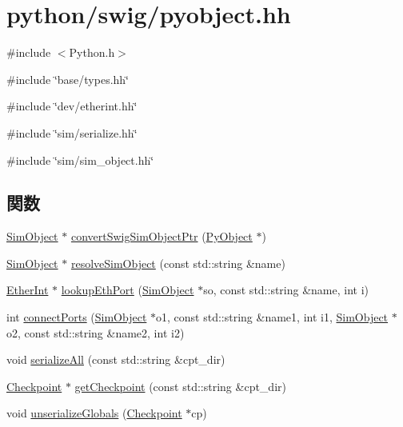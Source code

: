 \hypertarget{pyobject_8hh}{
\section{python/swig/pyobject.hh}
\label{pyobject_8hh}
}
{\ttfamily \#include $<$Python.h$>$}\par
{\ttfamily \#include \char`\"{}base/types.hh\char`\"{}}\par
{\ttfamily \#include \char`\"{}dev/etherint.hh\char`\"{}}\par
{\ttfamily \#include \char`\"{}sim/serialize.hh\char`\"{}}\par
{\ttfamily \#include \char`\"{}sim/sim\_\-object.hh\char`\"{}}\par
\subsection*{関数}
\begin{DoxyCompactItemize}
\item 
\hyperlink{classSimObject}{SimObject} $\ast$ \hyperlink{pyobject_8hh_a35bd8f1c38b15825afd59cae5bb0169e}{convertSwigSimObjectPtr} (\hyperlink{init_8hh_ae19630c1f4ca6d5236b30719d9140013}{PyObject} $\ast$)
\item 
\hyperlink{classSimObject}{SimObject} $\ast$ \hyperlink{pyobject_8hh_a86dd63b6a0431f583c8a984934c005ea}{resolveSimObject} (const std::string \&name)
\item 
\hyperlink{classEtherInt}{EtherInt} $\ast$ \hyperlink{pyobject_8hh_a7140d9d13a7d38ed7ac6fe75319f64ca}{lookupEthPort} (\hyperlink{classSimObject}{SimObject} $\ast$so, const std::string \&name, int i)
\item 
int \hyperlink{pyobject_8hh_a07ed93a9ca4128b7d2b30ee7a82bb77e}{connectPorts} (\hyperlink{classSimObject}{SimObject} $\ast$o1, const std::string \&name1, int i1, \hyperlink{classSimObject}{SimObject} $\ast$o2, const std::string \&name2, int i2)
\item 
void \hyperlink{pyobject_8hh_a4d874e18d11647800fec682fd72a51db}{serializeAll} (const std::string \&cpt\_\-dir)
\item 
\hyperlink{classCheckpoint}{Checkpoint} $\ast$ \hyperlink{pyobject_8hh_aac5019b5f736b89388804c7cb43bf754}{getCheckpoint} (const std::string \&cpt\_\-dir)
\item 
void \hyperlink{pyobject_8hh_a26aaa7facb37dfe9ef4c39b082978ef9}{unserializeGlobals} (\hyperlink{classCheckpoint}{Checkpoint} $\ast$cp)
\end{DoxyCompactItemize}


